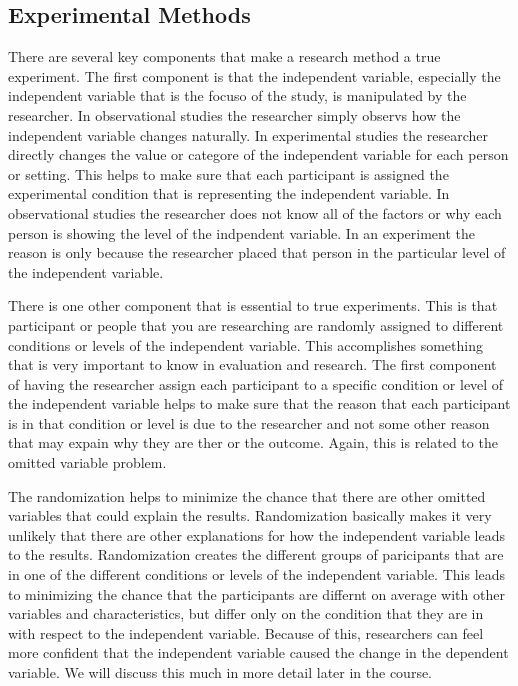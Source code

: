 \documentclass[]{book}
\theoremstyle{definition}
\theoremstyle{definition}
\theoremstyle{definition}
\theoremstyle{remark}
\begin{document}
\hypertarget{experimental-methods}{%
\subsection{Experimental Methods}\label{experimental-methods}}

There are several key components that make a research method a true
experiment. The first component is that the independent variable,
especially the independent variable that is the focuso of the study, is
manipulated by the researcher. In observational studies the researcher
simply observs how the independent variable changes naturally. In
experimental studies the researcher directly changes the value or
categore of the independent variable for each person or setting. This
helps to make sure that each participant is assigned the experimental
condition that is representing the independent variable. In
observational studies the researcher does not know all of the factors or
why each person is showing the level of the indpendent variable. In an
experiment the reason is only because the researcher placed that person
in the particular level of the independent variable.

There is one other component that is essential to true experiments. This
is that participant or people that you are researching are randomly
assigned to different conditions or levels of the independent variable.
This accomplishes something that is very important to know in evaluation
and research. The first component of having the researcher assign each
participant to a specific condition or level of the independent variable
helps to make sure that the reason that each participant is in that
condition or level is due to the researcher and not some other reason
that may expain why they are ther or the outcome. Again, this is related
to the omitted variable problem.

The randomization helps to minimize the chance that there are other
omitted variables that could explain the results. Randomization
basically makes it very unlikely that there are other explanations for
how the independent variable leads to the results. Randomization creates
the different groups of paricipants that are in one of the different
conditions or levels of the independent variable. This leads to
minimizing the chance that the participants are differnt on average with
other variables and characteristics, but differ only on the condition
that they are in with respect to the independent variable. Because of
this, researchers can feel more confident that the independent variable
caused the change in the dependent variable. We will discuss this much
in more detail later in the course.
\end{document}

